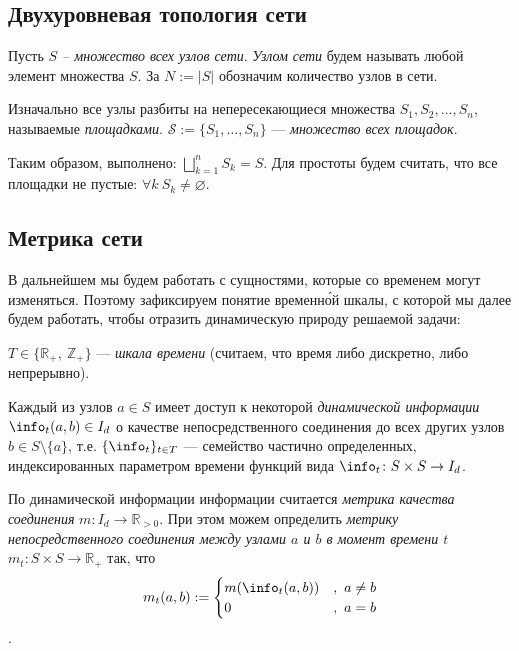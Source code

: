 \subsection{Двухуровневая топология сети}

\begin{definition}
    Пусть \textit{$S$ – множество всех узлов сети}. \textit{Узлом сети} будем называть любой элемент множества $S$. За $N := |S|$ обозначим количество узлов в сети.
\end{definition}

\begin{definition}
    Изначально все узлы разбиты на непересекающиеся множества $S_1, S_2, \ldots, S_n$, называемые \textit{площадками}. $\mathcal{S} := \{S_1, \ldots, S_n\}$ --- \textit{множество всех площадок}.
\end{definition}

Таким образом, выполнено: $\displaystyle \bigsqcup_{k = 1}^n S_k = S$. Для простоты будем считать, что все площадки не пустые: $\forall k\ S_k \neq \varnothing$.

\subsection{Метрика сети}
\label{MetricSubsection}

В дальнейшем мы будем работать с сущностями, которые со временем могут изменяться. Поэтому зафиксируем понятие временн\'{о}й шкалы, с которой мы далее будем работать, чтобы отразить динамическую природу решаемой задачи:

\begin{definition}
    $T \in \{\mathbb{R}_+,\ \mathbb{Z}_+\}$ --- \textit{шкала времени} (считаем, что время либо дискретно, либо непрерывно).
\end{definition}

\begin{definition}
    Каждый из узлов $a \in S$ имеет доступ к некоторой \textit{динамической информации} $\info_t(a, b) \in I_d$ о качестве непосредственного соединения до всех других узлов $b \in S \setminus \{a\}$, т.е. $\{\info_t\}_{t \in T}$ --- семейство частично определенных, индексированных параметром времени функций вида $\info_t \colon S \times S \to I_d$.
\end{definition}

\begin{definition}
\label{MetricDefinition}
    По динамической информации информации считается \textit{метрика качества соединения} $m \colon I_d \to \mathbb{R}_{>0}$. При этом можем определить \textit{метрику непосредственного соединения между узлами $a$ и $b$ в момент времени $t$} $m_t \colon S \times S \to \mathbb{R}_+$ так, что
    \[ m_t(a, b) :=
      \begin{cases}
        m(\info_t(a, b)) &,\ a \neq b \\
        0 &,\ a = b
      \end{cases}
    \].
\end{definition}

